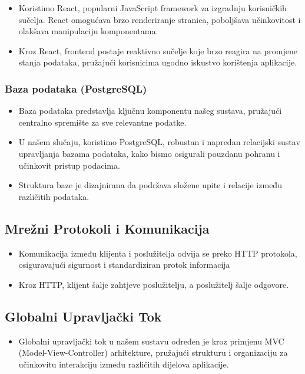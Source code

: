 \begin{itemize}
    \item Koristimo React, popularni JavaScript framework za izgradnju korisničkih sučelja. React omogućava brzo renderiranje stranica, poboljšava učinkovitost i olakšava manipulaciju komponentama.
    \item Kroz React, frontend postaje reaktivno sučelje koje brzo reagira na promjene stanja podataka, pružajući korisnicima ugodno iskustvo korištenja aplikacije.
\end{itemize}

 

\subsubsection*{Baza podataka (PostgreSQL)}
\begin{itemize}
    \item Baza podataka predstavlja ključnu komponentu našeg sustava, pružajući centralno spremište za sve relevantne podatke. 
    \item U našem slučaju, koristimo PostgreSQL, robustan i napredan relacijski sustav upravljanja bazama podataka, kako bismo osigurali pouzdanu pohranu i učinkovit pristup podacima. 
    \item Struktura baze je dizajnirana da podržava složene upite i relacije između različitih podataka.
\end{itemize}

\subsection*{Mrežni Protokoli i Komunikacija}
\begin{itemize}
    \item Komunikacija između klijenta i poslužitelja odvija se preko HTTP protokola, osiguravajući sigurnost i standardiziran protok informacija
    \item Kroz HTTP, klijent šalje zahtjeve poslužitelju, a poslužitelj šalje odgovore. 
\end{itemize}

\subsection*{Globalni Upravljački Tok}
\begin{itemize}
    \item Globalni upravljački tok u našem sustavu određen je kroz primjenu MVC (Model-View-Controller) arhitekture, pružajući strukturu i organizaciju za učinkovitu interakciju između različitih dijelova aplikacije. 
\end{itemize}

